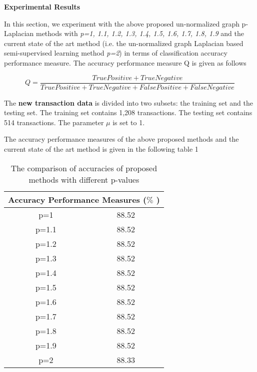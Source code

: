 \textbf{Experimental Results}


In this section, we experiment with the above proposed un-normalized graph p-Laplacian methods with \textit{p=1, 1.1, 1.2, 1.3, 1.4, 1.5, 1.6, 1.7, 1.8, 1.9} and the current state of the art method (i.e. the un-normalized graph Laplacian based semi-supervised learning method \textit{p=2}) in terms of classification accuracy performance measure. The accuracy performance measure Q is given as follows

$$Q=\frac{True Positive+True Negative}{True Positive+True Negative+False Positive+False Negative}$$

The \textbf{new transaction data} is divided into two subsets: the training set and the testing set. The training set contains 1,208 transactions. The testing set contains 514 transactions. The parameter  \(  \mu  \)  is set to 1.

The accuracy performance measures of the above proposed methods and the current state of the art method is given in the following table 1



\begin{table}[]
\centering
\caption{The comparison of accuracies of proposed methods with different p-values}
\label{tbl:accuracy_performance_measures}
\begin{tabular}{|c|c|}

\hline
\multicolumn{2}{|c|}{Accuracy Performance Measures ($\%$ )} \\
\hline
\multicolumn{1}{|c}{p=1} & 
\multicolumn{1}{|c|}{88.52} \\
\hline
\multicolumn{1}{|c}{p=1.1} & 
\multicolumn{1}{|c|}{88.52} \\
\hline
\multicolumn{1}{|c}{p=1.2} & 
\multicolumn{1}{|c|}{88.52} \\
\hline
\multicolumn{1}{|c}{p=1.3} & 
\multicolumn{1}{|c|}{88.52} \\
\hline
\multicolumn{1}{|c}{p=1.4} & 
\multicolumn{1}{|c|}{88.52} \\
\hline
\multicolumn{1}{|c}{p=1.5} & 
\multicolumn{1}{|c|}{88.52} \\
\hline
\multicolumn{1}{|c}{p=1.6} & 
\multicolumn{1}{|c|}{88.52} \\
\hline
\multicolumn{1}{|c}{p=1.7} & 
\multicolumn{1}{|c|}{88.52} \\
\hline
\multicolumn{1}{|c}{p=1.8} & 
\multicolumn{1}{|c|}{88.52} \\
\hline
\multicolumn{1}{|c}{p=1.9} & 
\multicolumn{1}{|c|}{88.52} \\
\hline
\multicolumn{1}{|c}{p=2} & 
\multicolumn{1}{|c|}{88.33} \\
\hline

\end{tabular}
\end{table}

